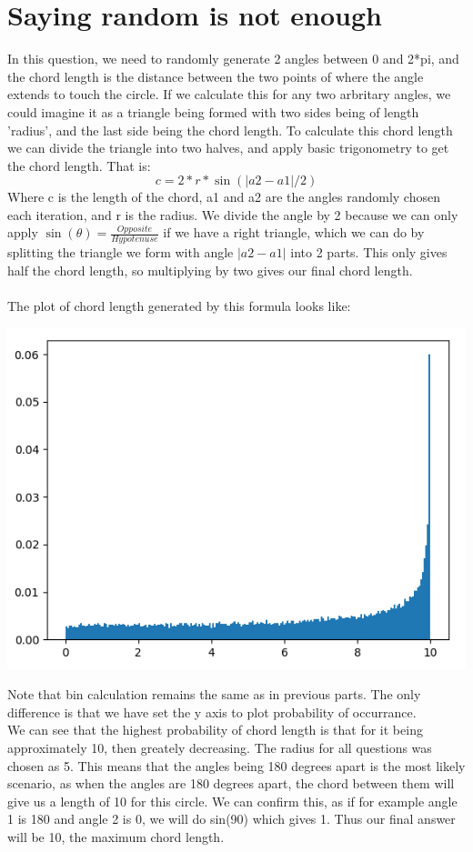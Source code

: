 \documentclass[addpoints]{exam}
\begin{document}
\newpage
\section{Saying random is not enough}
\begin{questions}
\question
In this question, we need to randomly generate 2 angles between 0 and 2*pi, and the chord length is the distance between the two points of where the angle extends to touch the circle. If we calculate this for any two arbritary angles, we could imagine it as a triangle being formed with two sides being of length 'radius', and the last side being the chord length. To calculate this chord length we can divide the triangle into two halves, and apply basic trigonometry to get the chord length. That is:\\
\begin{equation}
 c = 2 * r * \sin{(|a2-a1|/2)}
\end{equation}
Where c is the length of the chord, a1 and a2 are the angles randomly chosen each iteration, and r is the radius. We divide the angle by 2 because we can only apply $\sin(\theta) = \frac{Opposite}{Hypotenuse}$ if we have a right triangle, which we can do by splitting the triangle we form with angle $|a2-a1|$ into 2 parts. This only gives half the chord length, so multiplying by two gives our final chord length. \\
\\
The plot of chord length generated by this formula looks like: \\
\begin{center}
\includegraphics[width=.48\textwidth]{images/p4_1_1.png}
\end{center}
Note that bin calculation remains the same as in previous parts. The only difference is that we have set the y axis to plot probability of occurrance. \\
We can see that the highest probability of chord length is that for it being approximately 10, then greately decreasing. The radius for all questions was chosen as 5. This means that the angles being 180 degrees apart is the most likely scenario, as when the angles are 180 degrees apart, the chord between them will give us a length of 10 for this circle. We can confirm this, as if for example angle 1 is 180 and angle 2 is 0, we will do sin(90) which gives 1. Thus our final answer will be 10, the maximum chord length.

\end{questions}
\end{document}
